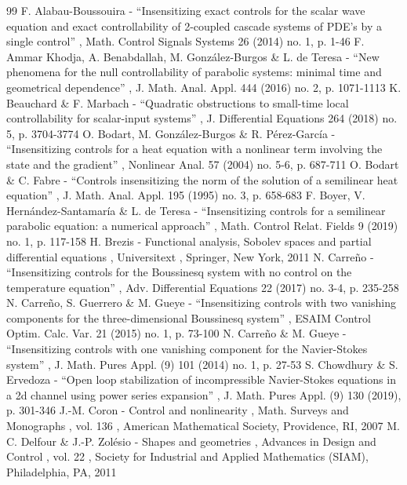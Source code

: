 \begin{thebibliography}{99}
 F. Alabau-Boussouira - “Insensitizing exact controls for the scalar wave equation and exact controllability of 2-coupled cascade systems of PDE’s by a single control” , Math. Control Signals Systems 26 (2014) no. 1, p. 1-46
 F. Ammar Khodja, A. Benabdallah, M. González-Burgos \& L. de Teresa - “New phenomena for the null controllability of parabolic systems: minimal time and geometrical dependence” , J. Math. Anal. Appl. 444 (2016) no. 2, p. 1071-1113
 K. Beauchard \& F. Marbach - “Quadratic obstructions to small-time local controllability for scalar-input systems” , J. Differential Equations 264 (2018) no. 5, p. 3704-3774
 O. Bodart, M. González-Burgos \& R. Pérez-García - “Insensitizing controls for a heat equation with a nonlinear term involving the state and the gradient” , Nonlinear Anal. 57 (2004) no. 5-6, p. 687-711
 O. Bodart \& C. Fabre - “Controls insensitizing the norm of the solution of a semilinear heat equation” , J. Math. Anal. Appl. 195 (1995) no. 3, p. 658-683
 F. Boyer, V. Hernández-Santamaría \& L. de Teresa - “Insensitizing controls for a semilinear parabolic equation: a numerical approach” , Math. Control Relat. Fields 9 (2019) no. 1, p. 117-158
 H. Brezis - Functional analysis, Sobolev spaces and partial differential equations , Universitext , Springer, New York, 2011
 N. Carreño - “Insensitizing controls for the Boussinesq system with no control on the temperature equation” , Adv. Differential Equations 22 (2017) no. 3-4, p. 235-258
 N. Carreño, S. Guerrero \& M. Gueye - “Insensitizing controls with two vanishing components for the three-dimensional Boussinesq system” , ESAIM Control Optim. Calc. Var. 21 (2015) no. 1, p. 73-100
 N. Carreño \& M. Gueye - “Insensitizing controls with one vanishing component for the Navier-Stokes system” , J. Math. Pures Appl. (9) 101 (2014) no. 1, p. 27-53
 S. Chowdhury \& S. Ervedoza - “Open loop stabilization of incompressible Navier-Stokes equations in a 2d channel using power series expansion” , J. Math. Pures Appl. (9) 130 (2019), p. 301-346
 J.-M. Coron - Control and nonlinearity , Math. Surveys and Monographs , vol. 136 , American Mathematical Society, Providence, RI, 2007
 M. C. Delfour \& J.-P. Zolésio - Shapes and geometries , Advances in Design and Control , vol. 22 , Society for Industrial and Applied Mathematics (SIAM), Philadelphia, PA, 2011

\end{thebibliography}
